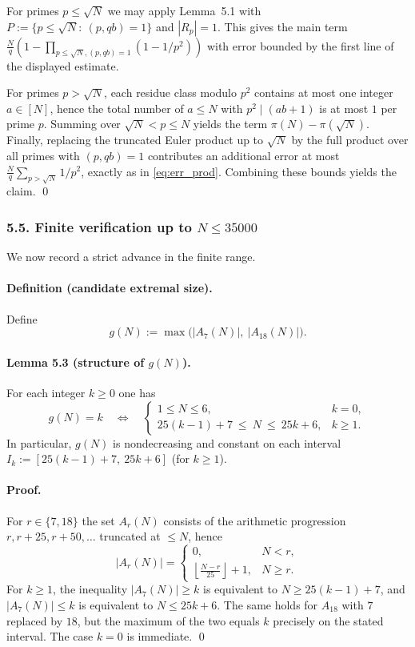 For primes $p\le \sqrt N$ we may apply Lemma~5.1 with $P:=\{p\le \sqrt N:\ (p,qb)=1\}$ and $|R_p|=1$.
This gives the main term $\frac{N}{q}(1-\prod_{p\le \sqrt N,(p,qb)=1}(1-1/p^2))$ with error bounded by the first line of the displayed estimate.

For primes $p>\sqrt N$, each residue class modulo $p^2$ contains at most one integer $a\in[N]$, hence the total number of $a\le N$ with $p^2\mid(ab+1)$ is at most $1$ per prime $p$.
Summing over $\sqrt N<p\le N$ yields the term $\pi(N)-\pi(\sqrt N)$.
Finally, replacing the truncated Euler product up to $\sqrt N$ by the full product over all primes with $(p,qb)=1$ contributes an additional error at most $\frac{N}{q}\sum_{p>\sqrt N}1/p^2$, exactly as in \eqref{eq:err_prod}.
Combining these bounds yields the claim.
\qed

\subsubsection*{5.5. Finite verification up to $N\le 35000$}
We now record a strict advance in the finite range.

\paragraph{Definition (candidate extremal size).}
Define
\[
g(N):=\max\bigl(|A_7(N)|,\ |A_{18}(N)|\bigr).
\]

\paragraph{Lemma 5.3 (structure of $g(N)$).}
For each integer $k\ge 0$ one has
\[
g(N)=k \quad\Longleftrightarrow\quad 
\begin{cases}
1\le N\le 6,& k=0,\\
25(k-1)+7\ \le\ N\ \le\ 25k+6,& k\ge 1.
\end{cases}
\]
In particular, $g(N)$ is nondecreasing and constant on each interval $I_k:=[25(k-1)+7,\ 25k+6]$ (for $k\ge 1$).

\paragraph{Proof.}
For $r\in\{7,18\}$ the set $A_r(N)$ consists of the arithmetic progression $r, r+25, r+50,\dots$ truncated at $\le N$, hence
\[
|A_r(N)|=
\begin{cases}
0,&N<r,\\
\left\lfloor\frac{N-r}{25}\right\rfloor+1,&N\ge r.
\end{cases}
\]
For $k\ge 1$, the inequality $|A_7(N)|\ge k$ is equivalent to $N\ge 25(k-1)+7$, and $|A_7(N)|\le k$ is equivalent to $N\le 25k+6$.
The same holds for $A_{18}$ with $7$ replaced by $18$, but the maximum of the two equals $k$ precisely on the stated interval.
The case $k=0$ is immediate.
\qed

